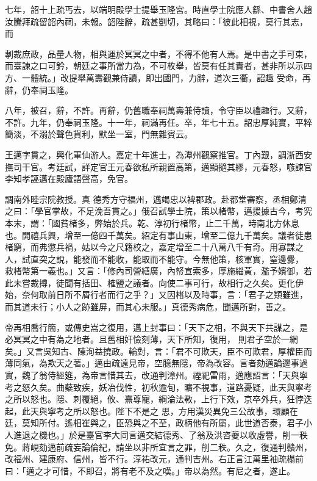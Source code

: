 \begin{pinyinscope}
 七年，韶十上疏丐去，以端明殿學士提舉玉隆宮。時直學士院應人繇、中書舍人趙汝騰拜疏留韶內祠，未報。韶陛辭，疏甚剴切，其略曰：「彼此相視，莫行其志，而



 剸裁庶政，品量人物，相與運於冥冥之中者，不得不他有人焉。是中書之手可束，而臺諫之口可鈐，朝廷之事所當力為，不可枚舉，皆莫有任其責者，甚非所以示四方、一體統。」改提舉萬壽觀兼侍讀，即出國門，力辭，道次三衢，詔趣
 受命，再辭，仍奉祠玉隆。



 八年，被召，辭，不許。再辭，仍舊職奉祠萬壽兼侍讀，令守臣以禮趣行。又辭，不許。九年，仍奉祠玉隆。十一年，祠滿再任。卒，年七十五。韶忠厚純實，平粹簡淡，不溺於聲色貨利，默坐一室，門無雜賓云。



 王邁字貫之，興化軍仙游人。嘉定十年進士，為潭州觀察推官。丁內艱，調浙西安撫司干官。考廷試，詳定官王元春欲私所親置高第，邁顯擿其繆，元春怒，嗾諫官李知孝誣邁在殿廬語聲高，免官。



 調南外睦宗院教授。真
 德秀方守福州，邁竭忠以裨郡政。赴都堂審察，丞相鄭清之曰：「學官掌故，不足浼吾貫之。」俄召試學士院，策以楮幣，邁援據古今，考究本末，謂：「國貧楮多，弊始於兵。乾、淳初行楮幣，止二千萬，時南北方休息也。開禧兵興，增至一億四千萬矣。紹定有事山東，增至二億九千萬矣。議者徒患楮窮，而弗懲兵禍，姑以今之尺籍校之，嘉定增至二十八萬八千有奇。用寡謀之人，試直突之說，能發而不能收，能取而不能守。今無他策，核軍實，窒邊釁，
 救楮幣第一義也。」又言：「修內司營繕廣，內帑宣索多，厚施緇黃，濫予嬪御，若此未嘗裁撙，徒聞有括田、榷鹽之議者。向使二事可行，故相行之久矣。更化伊始，奈何取前日所不屑行者而行之乎？」又因楮以及時事，言：「君子之類雖進，而其道未行；小人之跡雖屏，而其心未服。」真德秀病危，聞邁所對，善之。



 帝再相喬行簡，或傳史嵩之復用，邁上封事曰：「天下之相，不與天下共謀之，是必冥冥之中有為之地者。且舊相奸憸刻薄，天下所知，復用，
 則君子空於一網矣。」又言吳知古、陳洵益撓政。輪對，言：「君不可欺天，臣不可欺君，厚權臣而薄同氣，為欺天之著。」邁由疏遠見帝，空臆無隱，帝為改容。言者劾邁論邊事過實，魏了翁侍經筵，為帝言惜其去，改通判漳州。禋祀雷雨，邁應詔言：「天與寧考之怒久矣。曲蘗致疾，妖冶伐性，初秋逾旬，曠不視事，道路憂疑，此天與寧考之所以怒也。隱、刺覆絕，攸、熹尊寵，綱淪法斁，上行下效，京卒外兵，狂悖迭起，此天與寧考之所以怒也。陛下不是之
 思，方用漢災異免三公故事，環顧在廷，莫知所付。遙相崔與之，臣恐與之不至，政柄他有所屬，此世道否泰，君子小人進退之機也。」於是臺官李大同言邁交結德秀、了翁及洪咨夔以收虛譽，削一秩免。蔣峴劾邁前疏妄論倫紀，請坐以非所宜言之罪，削二秩。久之，復通判贛州，改福州、建康府、信州，皆不行。淳祐改元，通判吉州。右正言江萬里袖疏榻前曰：「邁之才可惜，不即召，將有老不及之嘆。」帝以為然。有尼之者，遂止。




\end{pinyinscope}
